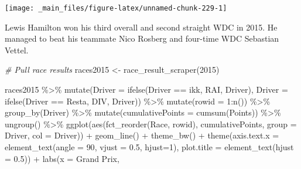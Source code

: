 \documentclass[
]{book}
\newenvironment{Shaded}{\begin{snugshade}}{\end{snugshade}}
\newcommand{\AttributeTok}[1]{\textcolor[rgb]{0.77,0.63,0.00}{#1}}
\newcommand{\CommentTok}[1]{\textcolor[rgb]{0.56,0.35,0.01}{\textit{#1}}}
\newcommand{\DecValTok}[1]{\textcolor[rgb]{0.00,0.00,0.81}{#1}}
\newcommand{\FloatTok}[1]{\textcolor[rgb]{0.00,0.00,0.81}{#1}}
\newcommand{\FunctionTok}[1]{\textcolor[rgb]{0.00,0.00,0.00}{#1}}
\newcommand{\NormalTok}[1]{#1}
\newcommand{\OtherTok}[1]{\textcolor[rgb]{0.56,0.35,0.01}{#1}}
\newcommand{\SpecialCharTok}[1]{\textcolor[rgb]{0.00,0.00,0.00}{#1}}
\newcommand{\StringTok}[1]{\textcolor[rgb]{0.31,0.60,0.02}{#1}}
\begin{document}
\begin{center}\texttt{[image: \_main\_files/figure-latex/unnamed-chunk-229-1]} \end{center}

Lewis Hamilton won his third overall and second straight WDC in 2015. He managed to beat his teammate Nico Rosberg and four-time WDC Sebastian Vettel.

\begin{Shaded}
\begin{Highlighting}[]
\CommentTok{\# Pull race results}
\NormalTok{races2015 }\OtherTok{\textless{}{-}} \FunctionTok{race\_result\_scraper}\NormalTok{(}\DecValTok{2015}\NormalTok{)}

\NormalTok{races2015 }\SpecialCharTok{\%\textgreater{}\%}
  \FunctionTok{mutate}\NormalTok{(}\AttributeTok{Driver =} \FunctionTok{ifelse}\NormalTok{(Driver }\SpecialCharTok{==} \StringTok{\textquotesingle{}ikk\textquotesingle{}}\NormalTok{, }\StringTok{\textquotesingle{}RAI\textquotesingle{}}\NormalTok{, Driver),}
         \AttributeTok{Driver =} \FunctionTok{ifelse}\NormalTok{(Driver }\SpecialCharTok{==} \StringTok{\textquotesingle{}Resta\textquotesingle{}}\NormalTok{, }\StringTok{\textquotesingle{}DIV\textquotesingle{}}\NormalTok{, Driver)) }\SpecialCharTok{\%\textgreater{}\%} 
  \FunctionTok{mutate}\NormalTok{(}\AttributeTok{rowid =} \DecValTok{1}\SpecialCharTok{:}\FunctionTok{n}\NormalTok{()) }\SpecialCharTok{\%\textgreater{}\%}
  \FunctionTok{group\_by}\NormalTok{(Driver) }\SpecialCharTok{\%\textgreater{}\%} 
  \FunctionTok{mutate}\NormalTok{(}\AttributeTok{cumulativePoints =} \FunctionTok{cumsum}\NormalTok{(Points)) }\SpecialCharTok{\%\textgreater{}\%}
  \FunctionTok{ungroup}\NormalTok{() }\SpecialCharTok{\%\textgreater{}\%} 
  \FunctionTok{ggplot}\NormalTok{(}\FunctionTok{aes}\NormalTok{(}\FunctionTok{fct\_reorder}\NormalTok{(Race, rowid), cumulativePoints,}
         \AttributeTok{group =}\NormalTok{ Driver, }\AttributeTok{col =}\NormalTok{ Driver)) }\SpecialCharTok{+}
  \FunctionTok{geom\_line}\NormalTok{() }\SpecialCharTok{+}
  \FunctionTok{theme\_bw}\NormalTok{() }\SpecialCharTok{+} 
  \FunctionTok{theme}\NormalTok{(}\AttributeTok{axis.text.x =} \FunctionTok{element\_text}\NormalTok{(}\AttributeTok{angle =} \DecValTok{90}\NormalTok{, }\AttributeTok{vjust =} \FloatTok{0.5}\NormalTok{, }\AttributeTok{hjust=}\DecValTok{1}\NormalTok{),}
        \AttributeTok{plot.title =} \FunctionTok{element\_text}\NormalTok{(}\AttributeTok{hjust =} \FloatTok{0.5}\NormalTok{)) }\SpecialCharTok{+}
  \FunctionTok{labs}\NormalTok{(}\AttributeTok{x =} \StringTok{\textquotesingle{}Grand Prix\textquotesingle{}}\NormalTok{,}

\end{Highlighting}
\end{Shaded}
\end{document}
